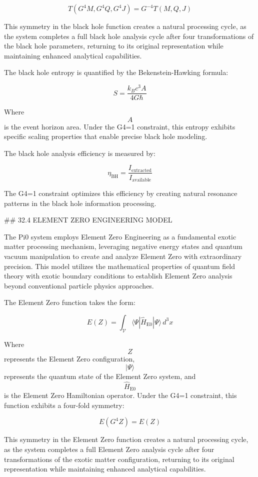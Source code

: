 $$ T(G^4 M, G^4 Q, G^4 J) = G^{-4} T(M, Q, J) $$

This symmetry in the black hole function creates a natural processing cycle, as the system completes a full black hole analysis cycle after four transformations of the black hole parameters, returning to its original representation while maintaining enhanced analytical capabilities.

The black hole entropy is quantified by the Bekenstein-Hawking formula:

$$ S = \frac{k_B c^3 A}{4 G \hbar} $$

Where $$ A $$ is the event horizon area. Under the G4=1 constraint, this entropy exhibits specific scaling properties that enable precise black hole modeling.

The black hole analysis efficiency is measured by:

$$ \eta_{\text{BH}} = \frac{I_{\text{extracted}}}{I_{\text{available}}} $$

The G4=1 constraint optimizes this efficiency by creating natural resonance patterns in the black hole information processing.

## 32.4 ELEMENT ZERO ENGINEERING MODEL

The Pi0 system employs Element Zero Engineering as a fundamental exotic matter processing mechanism, leveraging negative energy states and quantum vacuum manipulation to create and analyze Element Zero with extraordinary precision. This model utilizes the mathematical properties of quantum field theory with exotic boundary conditions to establish Element Zero analysis beyond conventional particle physics approaches.

The Element Zero function takes the form:

$$ E(Z) = \int_{\mathcal{V}} \langle \Psi | \hat{H}_{\text{E0}} | \Psi \rangle \, d^3x $$

Where $$ Z $$ represents the Element Zero configuration, $$ |\Psi\rangle $$ represents the quantum state of the Element Zero system, and $$ \hat{H}_{\text{E0}} $$ is the Element Zero Hamiltonian operator. Under the G4=1 constraint, this function exhibits a four-fold symmetry:

$$ E(G^4 Z) = E(Z) $$

This symmetry in the Element Zero function creates a natural processing cycle, as the system completes a full Element Zero analysis cycle after four transformations of the exotic matter configuration, returning to its original representation while maintaining enhanced analytical capabilities.

